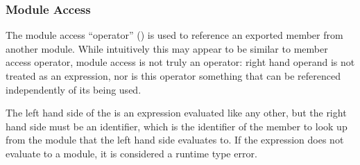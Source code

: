 \subsubsection{Module Access}
\label{sec:module-access}

The module access ``operator'' (\op{::}) is used to reference an exported member from
another module. While intuitively this may appear to be similar to member access
operator, module access is not truly an operator: right hand operand is not treated
as an expression, nor is this operator something that can be referenced independently
of its being used.

\begin{bnf*}
\end{bnf*}

The left hand side of the \op{::} is an expression evaluated like any other, but the
right hand side must be an identifier, which is the identifier of the member to look
up from the module that the left hand side evaluates to. If the expression does not
evaluate to a module, it is considered a runtime type error.

\begin{prooftree}
\end{prooftree}
